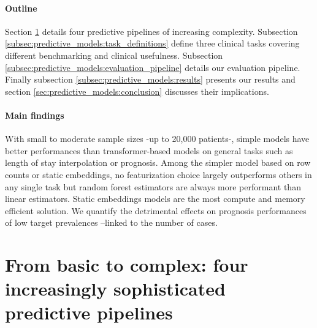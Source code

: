 \documentclass[french,12pt,twoside,a4paper]{book}
\begin{document}
\paragraph{Outline}
Section \ref{sec:predictive_models:pipelines} details four predictive pipelines
of increasing complexity. Subsection
\ref{subsec:predictive_models:task_definitions} define three clinical tasks
covering different benchmarking and clinical usefulness. Subsection
\ref{subsec:predictive_models:evaluation_pipeline} details our evaluation
pipeline. Finally subsection \ref{subsec:predictive_models:results} presents our
results and section \ref{sec:predictive_models:conclusion} discusses their
implications.

\paragraph{Main findings}

With small to moderate sample sizes -up to 20,000 patients-, simple models have
better performances than transformer-based models on general tasks such as
length of stay interpolation or prognosis. Among the simpler model based on row counts or
static embeddings, no featurization choice largely outperforms others in any
single task but random forest estimators are always more performant than linear
estimators. Static embeddings models are the most compute and memory efficient
solution. We quantify the detrimental effects on prognosis performances of
low target prevalences --linked to the number of cases.



\section{From basic to complex: four increasingly sophisticated predictive pipelines}%
\label{sec:predictive_models:pipelines}%
\end{document}

